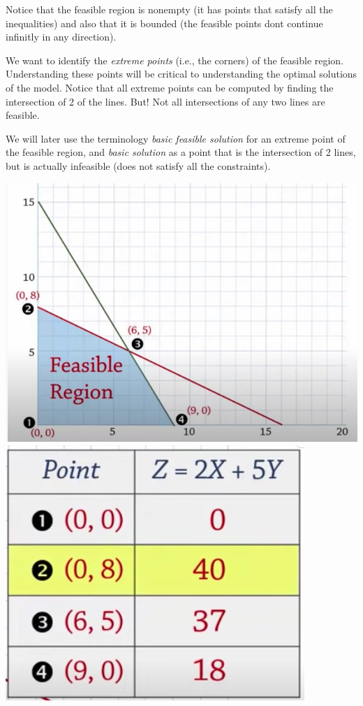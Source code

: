 Notice that the feasible region is nonempty (it has points that satisfy all the inequalities) and also that it is bounded (the feasible points dont continue infinitly in any direction).

We want to identify the \emph{extreme points} (i.e., the corners) of the feasible region. 
Understanding these points will be critical to understanding the optimal solutions of the model.
Notice that all extreme points can be computed by finding the intersection of 2 of the lines.   But!  Not all intersections of any two lines are feasible.  

We will later use the terminology \emph{basic feasible solution} for an extreme point of the feasible region, and \emph{basic solution} as a point that is the intersection of 2 lines, but is actually infeasible (does not satisfy all the constraints).

\begin{center}
\includegraphics[scale = 0.4]{screenshots/example0-extreme-points}
\includegraphics[scale = 0.4]{screenshots/example0-extreme-point-solutions}
\end{center}

